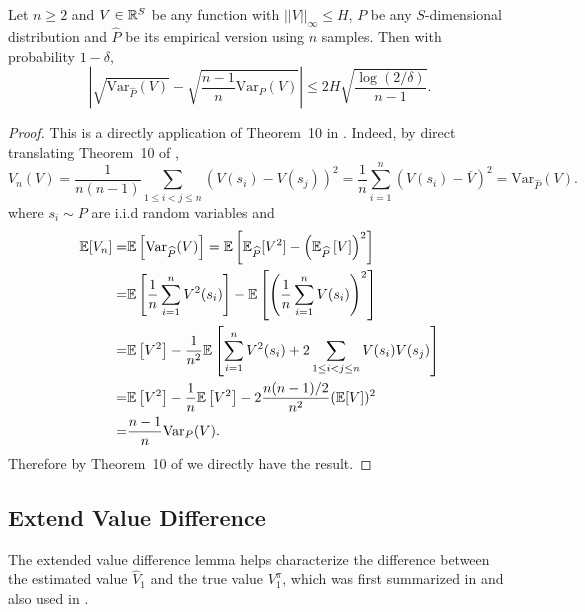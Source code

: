 \begin{lemma}\label{lem:sqrt_var_diff}
	Let $n\geq 2$ and $V\in\mathbb{R}^S$ be any function with $||V||_\infty\leq H$, $P$ be any $S$-dimensional distribution and $\widehat{P}$ be its empirical version using $n$ samples. Then with probability $1-\delta$,
	\[
	\left|\sqrt{\mathrm{Var}_{\widehat{P}}(V)}-\sqrt{\frac{n-1}{n}\mathrm{Var}_{{P}}(V)}\right|\leq 2H\sqrt{\frac{\log(2/\delta)}{n-1}}.
	\]
\end{lemma}

\begin{proof}
	This is a directly application of Theorem~10 in \cite{maurer2009empirical}. Indeed, by direct translating Theorem~10 of \cite{maurer2009empirical}, 
	\[
	V_n(V)=\frac{1}{n(n-1)} \sum_{1 \leq i<j \leq n}\left(V(s_{i})-V(s_{j})\right)^{2}=\frac{1}{n}\sum_{i=1}^n(V(s_i)-\overline{V})^2=\mathrm{Var}_{\widehat{P}}(V).
	\]
	where $s_i\sim P$ are i.i.d random variables and 
	\begin{align*}
	\mathbb{E}[V_n]=&\mathbb{E}\left[\mathrm{Var}_{\widehat{P}}(V)\right]=\mathbb{E}\left[\mathbb{E}_{\widehat{P}}[V^2]-\left(\mathbb{E}_{\widehat{P}}\left[V\right]\right)^2\right]\\
	=&\mathbb{E}\left[\frac{1}{n}\sum_{i=1}^n V^2(s_i)\right]-\mathbb{E}\left[\left(\frac{1}{n}\sum_{i=1}^n V(s_i)\right)^2\right]\\
	=&\mathbb{E}\left[V^2\right]-\frac{1}{n^2}\mathbb{E}\left[\sum_{i=1}^n V^2(s_i)+2\sum_{1\leq i<j\leq n}V(s_i)V(s_j)\right]\\
	=&\mathbb{E}\left[V^2\right]-\frac{1}{n}\mathbb{E}\left[V^2\right]-2\frac{n(n-1)/2}{n^2}(\mathbb{E}[V])^2\\
	=&\frac{n-1}{n}\mathrm{Var}_{{P}}(V).
	\end{align*}
	Therefore by Theorem~10 of \cite{maurer2009empirical} we directly have the result.
	
	
\end{proof}

\subsection{Extend Value Difference}

The extended value difference lemma helps characterize the difference between the estimated value $\widehat{V}_1$ and the true value $V_1^\pi$, which was first summarized in \cite{cai2020provably} and also used in \cite{jin2020pessimism}.

